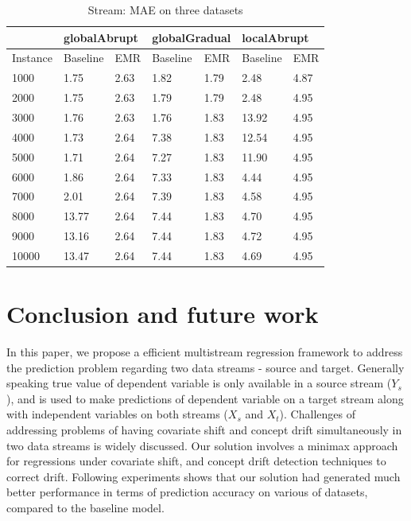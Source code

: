 \begin{table}[H]
\centering
\caption{Stream: MAE on three datasets}
\label{tab2}
\begin{tabular}{|l|l|l|l|l|l|l|}
\hline
          & \multicolumn{2}{l|}{globalAbrupt} & \multicolumn{2}{l|}{globalGradual} & \multicolumn{2}{l|}{localAbrupt} \\ \hline
Instance & Baseline        & EMR             & Baseline         & EMR             & Baseline        & EMR            \\ \hline
1000       & 1.75     & 2.63     & 1.82      & 1.79     & 2.48     & 4.87    \\ \hline
2000      & 1.75     & 2.63     & 1.79      & 1.79     & 2.48     & 4.95    \\ \hline
3000      & 1.76     & 2.63     & 1.76      & 1.83     & 13.92     & 4.95    \\ \hline
4000      & 1.73     & 2.64     & 7.38      & 1.83     & 12.54     & 4.95    \\ \hline
5000      & 1.71     & 2.64     & 7.27      & 1.83     & 11.90     & 4.95    \\ \hline
6000      & 1.86     & 2.64     & 7.33      & 1.83     & 4.44     & 4.95    \\ \hline
7000      & 2.01     & 2.64     & 7.39      & 1.83     & 4.58     & 4.95    \\ \hline
8000      & 13.77     & 2.64     & 7.44      & 1.83     & 4.70     & 4.95    \\ \hline
9000      & 13.16     & 2.64     & 7.44      & 1.83     & 4.72     & 4.95    \\ \hline
10000      & 13.47     & 2.64     & 7.44      & 1.83     & 4.69     & 4.95    \\ \hline

\end{tabular}
\end{table}

\section{Conclusion and future work}
\label{conclusion}

In this paper, we propose a efficient multistream regression
framework to address the prediction problem regarding two data
streams - source and target.
Generally speaking true value of dependent variable is only
available in a source stream ($Y_s$), and is used to make
predictions of dependent variable on a target stream along with
independent variables on both streams ($X_s$ and $X_t$). 
Challenges of addressing problems of having covariate shift and
concept drift simultaneously in two data streams is widely
discussed. Our solution involves a minimax approach for
regressions under covariate shift, and concept drift
detection techniques to correct drift. Following experiments
shows that our solution had generated much better performance in
terms of prediction accuracy on various of datasets, compared to
the baseline model.

